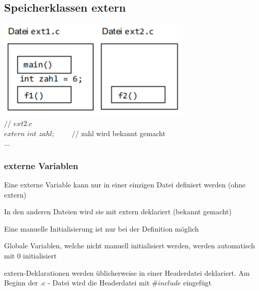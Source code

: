 			\subsection{Speicherklassen extern }
				\begin{minipage}[c]{9 cm}
					\includegraphics[width=0.7\textwidth]{pics/Speicherklasse_extern.png}\\
					$//$ $ext2.c$\\
					$extern$ $int$ $zahl;$ \ \ \ \ // zahl wird bekannt gemacht\\
					...
				\end{minipage}
				\hspace*{0.5cm}	
				\begin{minipage}[c]{9 cm}
					\vspace*{-0.4cm}
					\subsubsection{externe Variablen}
						\begin{compactitem}
							\item Eine externe Variable kann nur in einer einzigen Datei definiert werden (ohne
							extern)
							\item In den anderen Dateien wird sie mit extern deklariert (bekannt gemacht)
							\item Eine manuelle Initialisierung ist nur bei der Definition möglich
							\item Globale Variablen, welche nicht manuell initialisiert werden, werden
							automatisch mit 0 initialisiert
							\item extern-Deklarationen werden üblicherweise in einer Headerdatei deklariert. Am Beginn der .c - Datei wird die Headerdatei mit $\#include$ eingefügt
						\end{compactitem}
				\end{minipage}	
